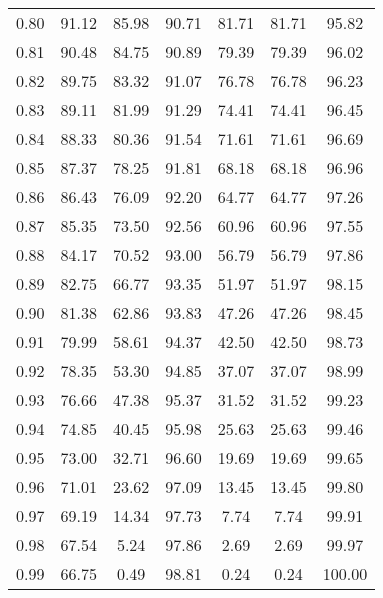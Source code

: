 \begin{tabular}{|c|c|c|c|c|c|c|}
      0.80 &     91.12 &     85.98 &      90.71 &   81.71 &      81.71 &         95.82 \\
      0.81 &     90.48 &     84.75 &      90.89 &   79.39 &      79.39 &         96.02 \\
      0.82 &     89.75 &     83.32 &      91.07 &   76.78 &      76.78 &         96.23 \\
      0.83 &     89.11 &     81.99 &      91.29 &   74.41 &      74.41 &         96.45 \\
      0.84 &     88.33 &     80.36 &      91.54 &   71.61 &      71.61 &         96.69 \\
      0.85 &     87.37 &     78.25 &      91.81 &   68.18 &      68.18 &         96.96 \\
      0.86 &     86.43 &     76.09 &      92.20 &   64.77 &      64.77 &         97.26 \\
      0.87 &     85.35 &     73.50 &      92.56 &   60.96 &      60.96 &         97.55 \\
      0.88 &     84.17 &     70.52 &      93.00 &   56.79 &      56.79 &         97.86 \\
      0.89 &     82.75 &     66.77 &      93.35 &   51.97 &      51.97 &         98.15 \\
      0.90 &     81.38 &     62.86 &      93.83 &   47.26 &      47.26 &         98.45 \\
      0.91 &     79.99 &     58.61 &      94.37 &   42.50 &      42.50 &         98.73 \\
      0.92 &     78.35 &     53.30 &      94.85 &   37.07 &      37.07 &         98.99 \\
      0.93 &     76.66 &     47.38 &      95.37 &   31.52 &      31.52 &         99.23 \\
      0.94 &     74.85 &     40.45 &      95.98 &   25.63 &      25.63 &         99.46 \\
      0.95 &     73.00 &     32.71 &      96.60 &   19.69 &      19.69 &         99.65 \\
      0.96 &     71.01 &     23.62 &      97.09 &   13.45 &      13.45 &         99.80 \\
      0.97 &     69.19 &     14.34 &      97.73 &    7.74 &       7.74 &         99.91 \\
      0.98 &     67.54 &      5.24 &      97.86 &    2.69 &       2.69 &         99.97 \\
      0.99 &     66.75 &      0.49 &      98.81 &    0.24 &       0.24 &        100.00 \\
\bottomrule
\end{tabular}
